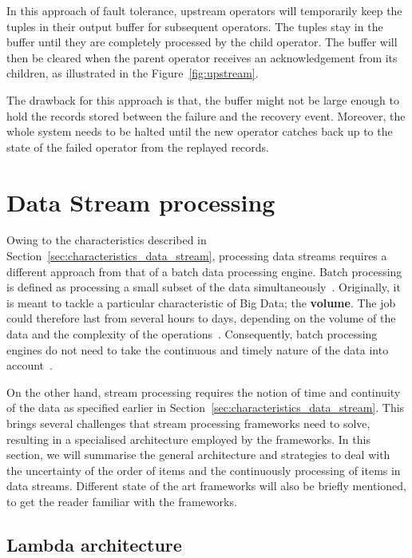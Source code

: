 In this approach of fault tolerance, upstream operators 
will temporarily 
keep the tuples in their output buffer for subsequent operators. The tuples 
stay in the buffer until they are completely processed by the child operator. 
The buffer will then be cleared when the parent operator receives 
an acknowledgement from its children, as illustrated in the Figure~\ref{fig:upstream}. 

The drawback for this approach is that, the buffer might not be large enough to 
hold the records stored between the failure and the recovery event. Moreover, 
the whole system needs to be halted until the new operator catches back up to 
the state of the failed operator from the replayed records. 

\section{Data Stream processing}

Owing to the characteristics described in Section~\ref{sec:characteristics_data_stream}, 
processing data streams requires a different approach from that of a batch data processing engine.
Batch processing is defined as processing a small subset of the data simultaneously~\cite{batch_processing}. 
Originally, it is meant to tackle a particular characteristic of Big Data; the \textbf{volume}. The job 
could therefore last from several hours to days, depending on the volume of the data and the 
complexity of the operations~\cite{batch_duration}.
Consequently, batch processing engines do not need to take the continuous and 
timely nature of the data into account~\cite{flink}.

On the other hand, stream processing requires the notion of time and continuity of the data as 
specified earlier in Section~\ref{sec:characteristics_data_stream}. This brings several challenges 
that stream processing frameworks need to solve, resulting in a specialised architecture employed by the 
frameworks. In this section, we will summarise the general architecture and strategies to deal with the 
uncertainty of the order of items and the continuously processing of items in data streams. Different 
state of the art frameworks will also be briefly mentioned, to get the reader familiar with the 
frameworks. 

\newpage

\subsection{Lambda architecture}

